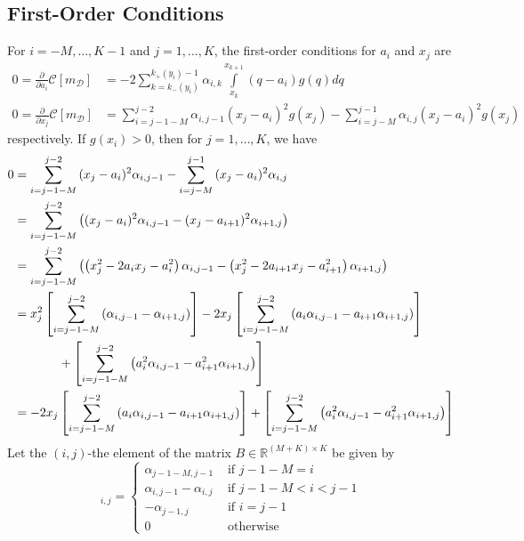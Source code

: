 \documentclass[12pt]{article}
\begin{document}
\subsection{First-Order Conditions}
For $i=-M,\ldots,K-1$ and $j=1,\ldots,K$, the first-order conditions for $a_{i}$ and $x_{j}$ are 
\begin{align}
	0=\frac{\partial}{\partial a_{i}}\mathcal{C}[m_{\mathcal{D}}]&=-2\sum_{k=k_{-}(y_{i})}^{k_{+}(y_{i})-1}{\alpha_{i,k}\int\limits_{x_{k}}^{x_{k+1}}{(q-a_{i})g(q)dq}}\label{foc_a}\\
	0=\frac{\partial}{\partial x_{j}}\mathcal{C}[m_{\mathcal{D}}]&=\sum_{i=j-1-M}^{j-2}{\alpha_{i,j-1}(x_{j}-a_{i})^{2}g(x_{j})}-\sum_{i=j-M}^{j-1}{\alpha_{i,j}(x_{j}-a_{i})^{2}g(x_{j})}
\end{align}
respectively. If $g(x_{i})>0$, then for $j=1,\ldots,K$, we have
\begin{align}
	0&=\sum_{i=j-1-M}^{j-2}{(x_{j}-a_{i})^{2}}\alpha_{i,j-1}-\sum_{i=j-M}^{j-1}{(x_{j}-a_{i})^{2}\alpha_{i,j}}\\
	&=\sum_{i=j-1-M}^{j-2}{\left((x_{j}-a_{i})^{2}\alpha_{i,j-1}-(x_{j}-a_{i+1})^{2}\alpha_{i+1,j}\right)}\\
	&=\sum_{i=j-1-M}^{j-2}{\left(\left(x_{j}^{2}-2a_{i}x_{j}-a_{i}^{2}\right)\alpha_{i,j-1}-\left(x_{j}^{2}-2a_{i+1}x_{j}-a_{i+1}^{2}\right)\alpha_{i+1,j}\right)}\\
	&=x_{j}^{2}\left[\sum_{i=j-1-M}^{j-2}{(\alpha_{i,j-1}-\alpha_{i+1,j})}\right]-2x_{j}\left[\sum_{i=j-1-M}^{j-2}{\left(a_{i}\alpha_{i,j-1}-a_{i+1}\alpha_{i+1,j}\right)}\right]\notag\\
	&\hspace{.5in}+\left[\sum_{i=j-1-M}^{j-2}{\left(a_{i}^{2}\alpha_{i,j-1}-a_{i+1}^{2}\alpha_{i+1,j}\right)}\right]\\
	&=-2x_{j}\left[\sum_{i=j-1-M}^{j-2}{\left(a_{i}\alpha_{i,j-1}-a_{i+1}\alpha_{i+1,j}\right)}\right]+\left[\sum_{i=j-1-M}^{j-2}{\left(a_{i}^{2}\alpha_{i,j-1}-a_{i+1}^{2}\alpha_{i+1,j}\right)}\right]
\end{align}
Let the $(i,j)$-the element of the matrix $B\in\mathbb{R}^{(M+K)\times K}$ be given by
\begin{equation}
	[B]_{i,j}=
	\begin{cases}
		\alpha_{j-1-M,j-1} & \text{ if } j-1-M=i \\
		\alpha_{i,j-1}-\alpha_{i,j} & \text{ if } j-1-M<i<j-1 \\
		-\alpha_{j-1,j} & \text{ if } i=j-1 \\
		0 & \text{ otherwise }
	\end{cases}
\end{equation}
\end{document}
